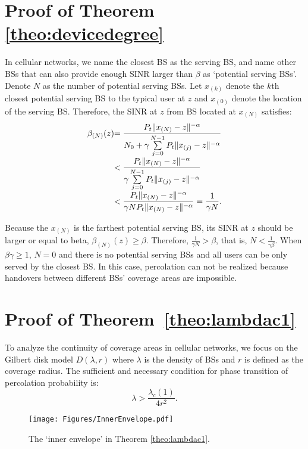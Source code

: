 \documentclass[final]{IEEEtran}
\begin{document}
\section{Proof of Theorem \ref{theo:devicedegree}}\label{app:devicedegree}
\indent In cellular networks, we name the closest BS as the serving BS, and name other BSs that can also provide enough SINR larger than $\beta$ as `potential serving BSs'. Denote $N$ as the number of potential serving BSs. Let $x_{(k)}$ denote the $k$th closest potential serving BS to the typical user at $z$ and $x_{(0)}$ denote the location of the serving BS. Therefore, the SINR at $z$ from BS located at $x_{(N)}$ satisfies:
\begin{equation}
\begin{array}{r@{}l}
    \beta_{(N)}(z)&=\displaystyle
    \frac{P_t \|x_{(N)}-z\|^{-\alpha}}{N_0+\gamma\sum\limits_{j=0}^{N-1} P_t \|x_{(j)}-z\|^{-\alpha}}\\
    &< \displaystyle
    \frac{P_t \|x_{(N)}-z\|^{-\alpha}}{\gamma\sum\limits_{j=0}^{N-1} P_t \|x_{(j)}-z\|^{-\alpha}}\\
    &< \displaystyle
    \frac{P_t \|x_{(N)}-z\|^{-\alpha}}{\gamma N P_t \|x_{(N)}-z\|^{-\alpha}}=\frac{1}{\gamma N}.
\end{array}
\end{equation}

Because the $x_{(N)}$ is the farthest potential serving BS, its SINR at $z$ should be larger or equal to beta, \ie $\beta_{(N)}(z)\geq\beta$. Therefore, $\frac{1}{\gamma N}>\beta$, that is, $N<\frac{1}{\gamma \beta}$.
When $\beta\gamma\geq 1$, $N=0$ and there is no potential serving BSs and all users can be only served by the closest BS. In this case, percolation can not be realized because handovers between different BSs' coverage areas are impossible.


\section{Proof of Theorem~\ref{theo:lambdac1}}\label{app:lambdac1}

 \indent To analyze the continuity of coverage areas in cellular networks, we focus on the Gilbert disk model $D(\lambda,r)$ where $\lambda$ is the density of BSs and $r$ is defined as the coverage radius. The sufficient and necessary condition for phase transition of percolation probability is:
 \begin{equation}
     \lambda>\frac{\lambda_c(1)}{4r^2}.
     \label{conditionGD}
 \end{equation}
 \begin{figure}
    \centering
    \texttt{[image: Figures/InnerEnvelope.pdf]}
    \caption{The `inner envelope' in Theorem \ref{theo:lambdac1}.}%
    \label{fig:InnerEnvelope}
\end{figure}
\end{document}

